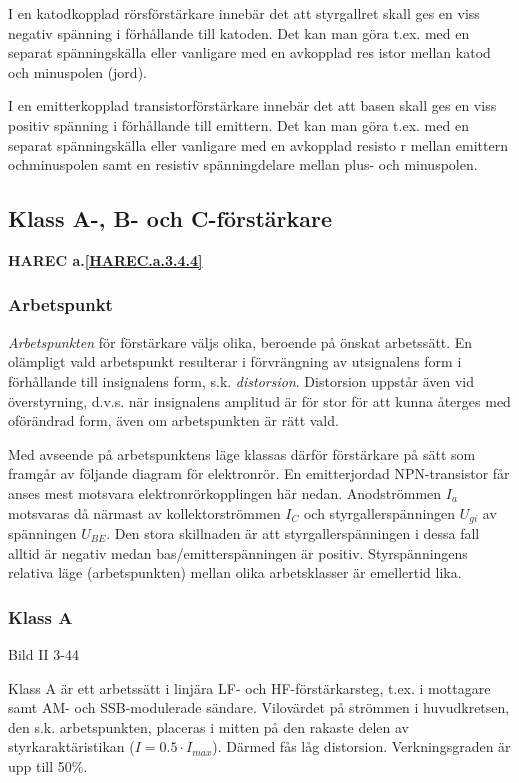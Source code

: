 I en katodkopplad rörsförstärkare innebär det att styrgallret skall
ges en viss negativ spänning i förhållande till katoden. Det kan man
göra t.ex. med en separat spänningskälla eller vanligare med en
avkopplad res istor mellan katod och minuspolen (jord).

I en emitterkopplad transistorförstärkare innebär det att basen skall
ges en viss positiv spänning i förhållande till emittern. Det kan man
göra t.ex. med en separat spänningskälla eller vanligare med en
avkopplad resisto r mellan emittern ochminuspolen samt en resistiv
spänningdelare mellan plus- och minuspolen.

\subsection{Klass A-, B- och C-förstärkare}
\textbf{HAREC a.\ref{HAREC.a.3.4.4}\label{myHAREC.a.3.4.4}}

\subsubsection{Arbetspunkt}

\emph{Arbetspunkten} för förstärkare väljs olika, beroende på önskat
arbetssätt. En olämpligt vald arbetspunkt resulterar i förvrängning av
utsignalens form i förhållande till insignalens form,
s.k. \emph{distorsion}. Distorsion uppstår även vid överstyrning,
d.v.s. när insignalens amplitud är för stor för att kunna återges med
oförändrad form, även om arbetspunkten är rätt vald.

Med avseende på arbetspunktens läge klassas därför förstärkare på sätt
som framgår av följande diagram för elektronrör. En emitterjordad
NPN-transistor får anses mest motsvara elektronrörkopplingen här
nedan.  Anodströmmen \(I_a\) motsvaras då närmast av kollektorströmmen
\(I_C\) och styrgallerspänningen \(U_{gi}\) av spänningen
\(U_{BE}\). Den stora skillnaden är att styrgallerspänningen i dessa
fall alltid är negativ medan bas/emitterspänningen är
positiv. Styrspänningens relativa läge (arbetspunkten) mellan olika
arbetsklasser är emellertid lika.

\subsubsection{Klass A}

Bild II 3-44

Klass A är ett arbetssätt i linjära LF- och HF-förstärkarsteg, t.ex. i
mottagare samt AM- och SSB-modulerade sändare. Vilovärdet på strömmen
i huvudkretsen, den s.k. arbetspunkten, placeras i mitten på den
rakaste delen av styrkaraktäristikan (\(I=0.5\cdot I_{max}\)).  Därmed
fås låg distorsion. Verkningsgraden är upp till 50\%.

